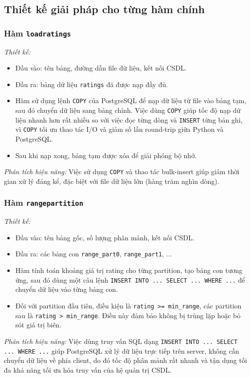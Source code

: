 \documentclass[a4paper]{article}
\begin{document}
\subsection{Thiết kế giải pháp cho từng hàm chính}

\subsubsection{Hàm \texttt{loadratings}}

\textit{Thiết kế:}
\begin{itemize}
    \item Đầu vào: tên bảng, đường dẫn file dữ liệu, kết nối CSDL.
    \item Đầu ra: bảng dữ liệu \texttt{ratings} đã được nạp đầy đủ.
    \item Hàm sử dụng lệnh \texttt{COPY} của PostgreSQL để nạp dữ liệu từ file vào bảng tạm, sau đó chuyển dữ liệu sang bảng chính. Việc dùng \texttt{COPY} giúp tốc độ nạp dữ liệu nhanh hơn rất nhiều so với việc đọc từng dòng và \texttt{INSERT} từng bản ghi, vì \texttt{COPY} tối ưu thao tác I/O và giảm số lần round-trip giữa Python và PostgreSQL.
    \item Sau khi nạp xong, bảng tạm được xóa để giải phóng bộ nhớ.
\end{itemize}
\textit{Phân tích hiệu năng:}  
Việc sử dụng \texttt{COPY} và thao tác bulk-insert giúp giảm thời gian xử lý đáng kể, đặc biệt với file dữ liệu lớn (hàng trăm nghìn dòng).

\subsubsection{Hàm \texttt{rangepartition}}

\textit{Thiết kế:}
\begin{itemize}
    \item Đầu vào: tên bảng gốc, số lượng phân mảnh, kết nối CSDL.
    \item Đầu ra: các bảng con \texttt{range\_part0}, \texttt{range\_part1}, ...
    \item Hàm tính toán khoảng giá trị rating cho từng partition, tạo bảng con tương ứng, sau đó dùng một câu lệnh \texttt{INSERT INTO ... SELECT ... WHERE ...} để chuyển dữ liệu vào từng bảng con.
    \item Đối với partition đầu tiên, điều kiện là \texttt{rating >= min\_range}, các partition sau là \texttt{rating > min\_range}. Điều này đảm bảo không bị trùng lặp hoặc bỏ sót giá trị biên.
\end{itemize}
\textit{Phân tích hiệu năng:}  
Việc dùng truy vấn SQL dạng \texttt{INSERT INTO ... SELECT ... WHERE ...} giúp PostgreSQL xử lý dữ liệu trực tiếp trên server, không cần chuyển dữ liệu về phía client, do đó tốc độ phân mảnh rất nhanh và tận dụng tối đa khả năng tối ưu hóa truy vấn của hệ quản trị CSDL.
\end{document}
